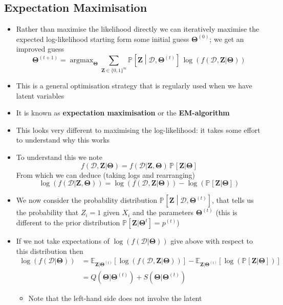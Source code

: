 \documentclass[11pt]{article}
\newcommand{\av}[2][]{\mathbb{E}_{#1\!}\left[ #2 \right]}
\newcommand{\Prob}[2][]{\mathbb{P}_{#1\!}\left[ #2 \right]}
\newcommand{\logg}[1]{\log\!\left( #1 \right)}
\newcommand{\argmax}{\mathop{\mathrm{argmax}}}
\begin{document}
\subsection{Expectation Maximisation}
\label{sec:orgc601352}
\begin{itemize}
\item Rather than maximise the likelihood directly we can iteratively
maximise the expected log-likelihood starting form some initial guess
\(\bm{\Theta}^{(0)}\); we get an improved guess
\begin{equation}
\bm{\Theta}^{(t+1)} = \argmax_{\bm{\Theta}}
\sum_{\bm{Z}\in\{0,1\}^m} \Prob{\bm{Z}\middle|\mathcal{D},\bm{\Theta}^{(t)}}\,
\logg{f(\mathcal{D},\bm{Z} | \bm{\Theta})} \label{eq:em}
\end{equation}
\item This is a general optimisation strategy that is regularly used
when we have latent variables
\item It is known as \textbf{expectation maximisation} or the \textbf{EM-algorithm}
\item This looks very different to maximising the log-likelihood: it
takes some effort to understand why this works
\item To understand this we note
$$f(\mathcal{D},\bm{Z}|\bm{\Theta}) =
      f(\mathcal{D}|\bm{Z},\bm{\Theta}) \, \Prob{\bm{Z}|\bm{\Theta}}  $$
From which we can deduce (taking logs and rearranging)
$$ \logg{f(\mathcal{D}|\bm{Z},\bm{\Theta})} = \logg{f(\mathcal{D},\bm{Z}|\bm{\Theta})} - \logg{\Prob{\bm{Z}|\bm{\Theta}} } $$
\item We now consider the probability distribution
\(\Prob{\bm{Z}\middle|\mathcal{D},\bm{\Theta}^{(t)}}\), that
tells us the probability that \(Z_i=1\) given \(X_i\) and the
parameters \(\bm{\Theta}^{(t)}\) (this is different to the prior
distribution \(\Prob{\bm{Z}|\bm{\Theta}^{t}} = p^{(t)}\))
\item If we not take expectations of
\(\logg{f(\mathcal{D}|\bm{\Theta})}\) give above with respect to
this distribution then
\begin{align*}
  \logg{f(\mathcal{D}|\bm{\Theta})}
   &= \av[\bm{Z}|\bm{\Theta}^{(t)}]{\logg{f(\mathcal{D},\bm{Z}|\bm{\Theta})}}
- \av[\bm{Z}|\bm{\Theta}^{(t)}]{\logg{\Prob{\bm{Z}|\bm{\Theta}} }}
  \\
  &= Q(\bm{\Theta}|\bm{\Theta}^{(t)}) +
  S(\bm{\Theta}|\bm{\Theta}^{(t)})
\end{align*}
\begin{itemize}
\item Note that the left-hand side does not involve the latent

\end{itemize}
\end{itemize}
\end{document}
